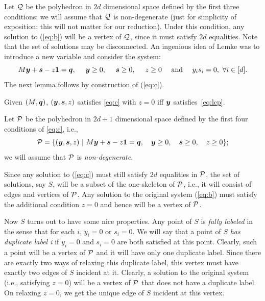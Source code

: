 Let $\mbox{${\mathcal Q}$}$ be the polyhedron in $2d$ dimensional space defined by the first three conditions; we will assume that $\mbox{${\mathcal Q}$}$ is
non-degenerate (just for simplicity of exposition; this will not matter for our reduction).  
Under this condition, any solution to (\ref{eq:b}) will be a vertex of $\mbox{${\mathcal Q}$}$, since it must satisfy $2d$
equalities. Note that the set of solutions may be disconnected.
%
An ingenious idea of Lemke was to introduce a new variable and consider the system:
\begin{equation} \label{eq:c} \mbox{$M$} \mbox{\boldmath $y$}  + \mbox{\boldmath $s$} -z \mbox{\boldmath $1$}  = \mbox{\boldmath $q$}, \ \ \ \  \mbox{\boldmath $y$} \geq 0, \ \ \ \ \mbox{\boldmath $s$} \geq 0, \ \ \ \  z \geq 0  \ \
\ \ \mbox{and} \ \ \ \ y_is_i = 0,\ \forall i\in[d].  \end{equation}
The next lemma follows by construction of (\ref{eq:c}).
\begin{lemma}\label{lem:lemke1}
Given $(\mbox{$M$},\mbox{\boldmath $q$})$, $(\mbox{\boldmath $y$},\mbox{\boldmath $s$},z)$ satisfies \eqref{eq:c} with $z=0$ iff $\mbox{\boldmath $y$}$ satisfies~\eqref{eq:lcp}.
\end{lemma}
%
Let $\mbox{${\mathcal P}$}$ be the polyhedron in $2d + 1$ dimensional space defined by the first four conditions of \eqref{eq:c}, i.e.,
\begin{equation}\label{eq:cp}
\mbox{${\mathcal P}$} = \{ (\mbox{\boldmath $y$},\mbox{\boldmath $s$}, z) \ |\ \mbox{$M$} \mbox{\boldmath $y$}  + \mbox{\boldmath $s$} -z \mbox{\boldmath $1$}  = \mbox{\boldmath $q$}, \ \ \ \mbox{\boldmath $y$} \geq 0, \ \ \ \mbox{\boldmath $s$} \geq 0, \ \ \  z \geq 0\};
\end{equation}
we will assume that $\mbox{${\mathcal P}$}$ is {\em non-degenerate}.  

Since any solution to (\ref{eq:c}) must still satisfy $2d$ equalities in $\mbox{${\mathcal P}$}$, the set of solutions, say
$S$, will be a subset of the one-skeleton of $\mbox{${\mathcal P}$}$, i.e., it will consist of edges and vertices of $\mbox{${\mathcal P}$}$.  Any solution to
the original system (\ref{eq:b}) must satisfy the additional condition $z = 0$ and hence will be a vertex of $\mbox{${\mathcal P}$}$.



Now $S$ turns out to have some nice properties. Any point of $S$ is {\em fully labeled} in the sense that for each $i$, $y_i
= 0$ or $s_i = 0$.  We will say that a point of $S$ {\em has duplicate label i} if $y_i = 0$ and $s_i = 0$ are both satisfied
at this point. Clearly, such a point will be a vertex of $\mbox{${\mathcal P}$}$ and it will have only one duplicate label.  Since there are
exactly two ways of relaxing this duplicate label, this vertex must have exactly two edges of $S$ incident at it.  Clearly, a
solution to the original system (i.e., satisfying $z = 0$) will be a vertex of $\mbox{${\mathcal P}$}$ that does not have a duplicate label.  On
relaxing $z=0$, we get the unique edge of $S$ incident at this vertex.

